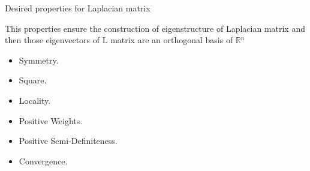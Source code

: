 \documentclass[10pt, compress, english]{beamer}
\begin{document}
\begin{frame}{Desired properties for Laplacian matrix}


This properties ensure the construction of eigenstructure of Laplacian
matrix and then those eigenvectors of L matrix are an orthogonal basis
of $\mathbb{R}{}^{n}$
\begin{itemize}
\item Symmetry.
\item Square.
\item Locality.
\item Positive Weights.
\item Positive Semi-Definiteness.
\item Convergence.
\end{itemize}
\end{frame}
\end{document}
